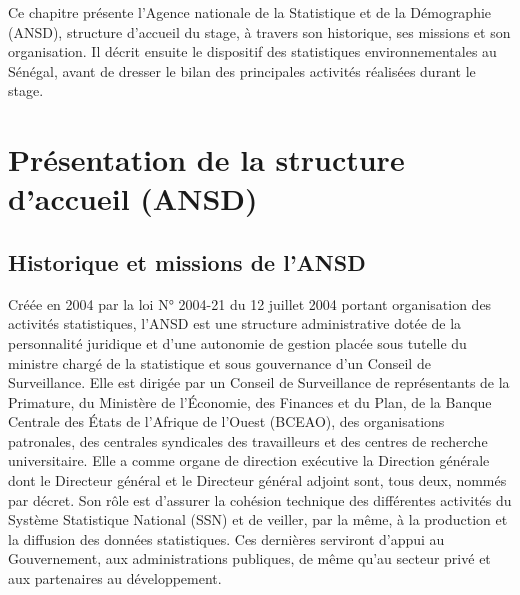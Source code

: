 \documentclass[12pt,a4paper]{report}
\begin{document}
\begin{chapterintro}
\begin{justify}
Ce chapitre présente l'Agence nationale de la Statistique et de la Démographie (ANSD), structure d'accueil du stage, à travers son historique, ses missions et son organisation. Il décrit ensuite le dispositif des statistiques environnementales au Sénégal, avant de dresser le bilan des principales activités réalisées durant le stage.
\end{justify}
\end{chapterintro}

\vspace{0.45cm}
\noindent{\color{navyblue}\rule{\textwidth}{1.1pt}}
\vspace{0.35cm}

\section{Présentation de la structure d'accueil (ANSD)}

\subsection{Historique et missions de l'ANSD}
Créée en 2004 par la loi N° 2004-21 du 12 juillet 2004 portant organisation des activités statistiques, l'ANSD est une structure administrative dotée de la personnalité juridique et d'une autonomie de gestion placée sous tutelle du ministre chargé de la statistique et sous gouvernance d'un Conseil de Surveillance. Elle est dirigée par un Conseil de Surveillance de représentants de la Primature, du Ministère de l'Économie, des Finances et du Plan, de la Banque Centrale des États de l'Afrique de l'Ouest (BCEAO), des organisations patronales, des centrales syndicales des travailleurs et des centres de recherche universitaire. Elle a comme organe de direction exécutive la Direction générale dont le Directeur général et le Directeur général adjoint sont, tous deux, nommés par décret. Son rôle est d'assurer la cohésion technique des différentes activités du Système Statistique National (SSN) et de veiller, par la même, à la production et la diffusion des données statistiques. Ces dernières serviront d'appui au Gouvernement, aux administrations publiques, de même qu'au secteur privé et aux partenaires au développement.
\end{document}
